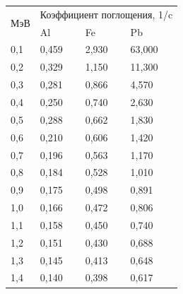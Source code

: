 \documentclass[a4paper]{article}
\begin{document}
\begin{table}[H]
    \begin{center}
    \begin{tabular}{|l|l|l|l|}
    \hline
    \multicolumn{1}{|c|}{\multirow{2}{*}{МэВ}} & \multicolumn{3}{c|}{Коэффициент   поглощения, 1/c} \\ \cline{2-4} 
    \multicolumn{1}{|c|}{}                     & Al              & Fe             & Pb              \\ \hline
    0,1                                        & 0,459           & 2,930          & 63,000          \\ \hline
    0,2                                        & 0,329           & 1,150          & 11,300          \\ \hline
    0,3                                        & 0,281           & 0,866          & 4,570           \\ \hline
    0,4                                        & 0,250           & 0,740          & 2,630           \\ \hline
    0,5                                        & 0,288           & 0,662          & 1,830           \\ \hline
    0,6                                        & 0,210           & 0,606          & 1,420           \\ \hline
    0,7                                        & 0,196           & 0,563          & 1,170           \\ \hline
    0,8                                        & 0,184           & 0,528          & 1,010           \\ \hline
    0,9                                        & 0,175           & 0,498          & 0,891           \\ \hline
    1,0                                        & 0,166           & 0,472          & 0,806           \\ \hline
    1,1                                        & 0,158           & 0,450          & 0,740           \\ \hline
    1,2                                        & 0,151           & 0,430          & 0,688           \\ \hline
    1,3                                        & 0,145           & 0,413          & 0,648           \\ \hline
    1,4                                        & 0,140           & 0,398          & 0,617           \\ \hline

\end{tabular}
\end{center}
\end{table}
\end{document}
